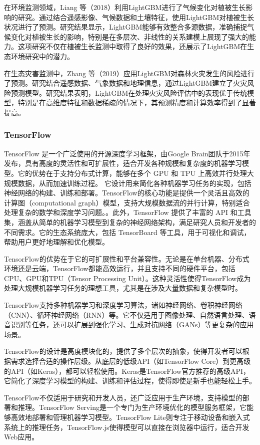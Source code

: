 \documentclass{article}
\begin{document}
	在环境监测领域，Liang 等（2018）利用LightGBM进行了气候变化对植被生长影响的研究。通过结合遥感影像、气候数据和土壤特征，使用LightGBM对植被生长状况进行了预测。研究结果显示，LightGBM能够有效整合多源数据，准确捕捉气候变化对植被生长的影响，特别是在多层次、非线性的关系建模上展现了强大的能力。这项研究不仅在植被生长监测中取得了良好的效果，还展示了LightGBM在生态环境研究中的潜力。
	
	在生态灾害监测中，Zhang 等（2019）应用LightGBM对森林火灾发生的风险进行了预测。研究结合遥感数据、气象数据和地理信息，通过LightGBM建立了火灾风险预测模型。研究结果表明，LightGBM在处理火灾风险评估中的表现优于传统模型，特别是在高维度特征和数据稀疏的情况下，其预测精度和计算效率得到了显著提高。
	
	\subsubsection{TensorFlow}
	
	TensorFlow 是一个广泛使用的开源深度学习框架，由Google Brain团队于2015年发布，具有高度的灵活性和可扩展性，适合开发各种规模和复杂度的机器学习模型。它的优势在于支持分布式计算，能够在多个 GPU 和 TPU 上高效并行处理大规模数据，从而加速训练过程。
	它设计用来简化各种机器学习任务的实现，包括神经网络的构建、训练和部署。TensorFlow的核心功能是提供一个灵活且高效的计算图（computational graph）模型，支持大规模数据流的并行计算，特别适合处理复杂的数学和深度学习问题。。此外，TensorFlow 提供了丰富的 API 和工具集，涵盖从简单的机器学习模型到复杂的神经网络架构，满足研究人员和开发者的不同需求。它的生态系统庞大，包括 TensorBoard 等工具，用于可视化和调试，帮助用户更好地理解和优化模型。
		
	TensorFlow的优势在于它的可扩展性和平台兼容性。无论是在单台机器、分布式环境还是云端，TensorFlow都能高效运行，并且支持不同的硬件平台，包括CPU、GPU和TPU（Tensor Processing Unit）。这种灵活性使得TensorFlow成为处理大规模机器学习任务的理想工具，尤其是在涉及大量数据和复杂模型时。
	
	TensorFlow支持多种机器学习和深度学习算法，诸如神经网络、卷积神经网络（CNN）、循环神经网络（RNN）等。它不仅适用于图像处理、自然语言处理、语音识别等任务，还可以扩展到强化学习、生成对抗网络（GANs）等更复杂的应用场景。
	
	TensorFlow的设计是高度模块化的，提供了多个层次的抽象，使得开发者可以根据需求选择合适的操作层级。从底层的低级API（如TensorFlow Core）到更高级的API（如Keras），都可以轻松使用。Keras是TensorFlow官方推荐的高级API，它简化了深度学习模型的构建、训练和评估过程，使得即使是新手也能轻松上手。
	
	TensorFlow不仅适用于研究和开发人员，还广泛应用于生产环境，支持模型的部署和推理。TensorFlow Serving是一个专门为生产环境优化的模型服务框架，它能够高效地部署和管理机器学习模型。TensorFlow Lite则专注于移动设备和嵌入式系统上的推理任务，TensorFlow.js使得模型可以直接在浏览器中运行，适合开发Web应用。
	
\end{document}

